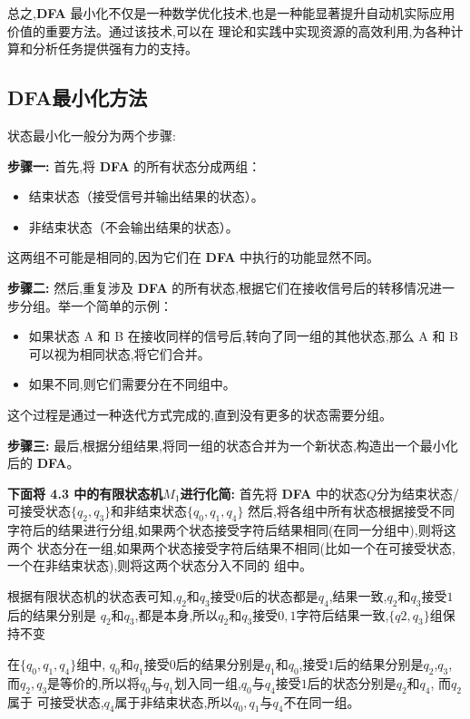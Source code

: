 \documentclass[UTF8]{ctexart}
\begin{document}
	总之,\textbf{DFA} 最小化不仅是一种数学优化技术,也是一种能显著提升自动机实际应用价值的重要方法。通过该技术,可以在
	理论和实践中实现资源的高效利用,为各种计算和分析任务提供强有力的支持。
	
	
	
	\subsection{DFA最小化方法}
	状态最小化一般分为两个步骤:
	
	\textbf{步骤一: }
	首先,将 \textbf{DFA} 的所有状态分成两组：
	\begin{itemize}
		\item 结束状态（接受信号并输出结果的状态）。
		\item 非结束状态（不会输出结果的状态）。 
	\end{itemize}
	
	这两组不可能是相同的,因为它们在 \textbf{DFA} 中执行的功能显然不同。   
	
	\textbf{步骤二: }
	然后,重复涉及 \textbf{DFA} 的所有状态,根据它们在接收信号后的转移情况进一步分组。举一个简单的示例：
	\begin{itemize}
		\item 如果状态 A 和 B 在接收同样的信号后,转向了同一组的其他状态,那么 A 和 B 可以视为相同状态,将它们合并。
		\item 如果不同,则它们需要分在不同组中。
	\end{itemize}
	
	这个过程是通过一种迭代方式完成的,直到没有更多的状态需要分组。
	
	\textbf{步骤三: }
	最后,根据分组结果,将同一组的状态合并为一个新状态,构造出一个最小化后的 \textbf{DFA}。
	
	
	\textbf{下面将 4.3 中的有限状态机$M_1$进行化简:}
	首先将 \textbf{DFA} 中的状态$Q$分为结束状态/可接受状态$\{q_2,q_3\}$和非结束状态$\{q_0,q_1,q_4\}$
	然后,将各组中所有状态根据接受不同字符后的结果进行分组,如果两个状态接受字符后结果相同(在同一分组中),则将这两个
	状态分在一组,如果两个状态接受字符后结果不相同(比如一个在可接受状态,一个在非结束状态),则将这两个状态分入不同的
	组中。
	
	根据有限状态机的状态表可知,$q_2$和$q_3$接受$0$后的状态都是$q_4$,结果一致,$q_2$和$q_3$接受$1$后的结果分别是
	$q_2$和$q_3$,都是本身,所以$q_2$和$q_3$接受$0,1$字符后结果一致,$\{q2,q_3\}$组保持不变
	
	在$\{q_0,q_1,q_4\}$组中, $q_0$和$q_1$接受$0$后的结果分别是$q_1$和$q_0$,接受$1$后的结果分别是$q_2$,$q_3$,
	而$q_2,q_3$是等价的,所以将$q_0$与$q_1$划入同一组,$q_0$与$q_4$接受$1$后的状态分别是$q_2$和$q_4$, 而$q_2$属于
	可接受状态,$q_4$属于非结束状态,所以$q_0,q_1$与$q_4$不在同一组。
	
\end{document}
